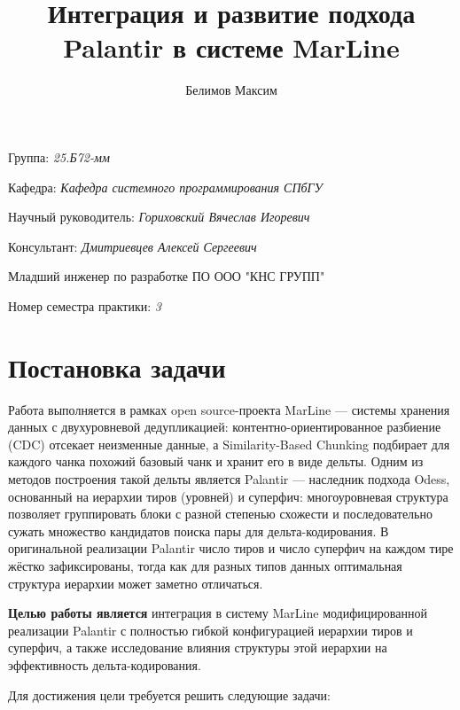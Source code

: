 \documentclass[a4paper]{article}
\title{Интеграция и развитие подхода Palantir в системе MarLine}
\author{Белимов Максим}
\date{}
\begin{document}
\maketitle

\begin{flushright}
    Группа: \emph{25.Б72-мм}

    Кафедра: \emph{Кафедра системного программирования СПбГУ}

    Научный руководитель: \emph{Гориховский Вячеслав Игоревич}

    Консультант: \emph{Дмитриевцев Алексей Сергеевич}

    Младший инженер по разработке ПО ООО "КНС ГРУПП"

    Номер семестра практики: \emph{3}
\end{flushright}

\section{Постановка задачи}

Работа выполняется в рамках open source-проекта MarLine --- системы хранения данных с двухуровневой дедупликацией: контентно-ориентированное разбиение (CDC) отсекает неизменные данные, а Similarity-Based Chunking подбирает для каждого чанка похожий базовый чанк и хранит его в виде дельты. Одним из методов построения такой дельты является Palantir --- наследник подхода Odess, основанный на иерархии тиров (уровней) и суперфич: многоуровневая структура позволяет группировать блоки с разной степенью схожести и последовательно сужать множество кандидатов поиска пары для дельта-кодирования. В оригинальной реализации Palantir число тиров и число суперфич на каждом тире жёстко зафиксированы, тогда как для разных типов данных оптимальная структура иерархии может заметно отличаться.

\textbf{Целью работы является} интеграция в систему MarLine модифицированной реализации Palantir с полностью гибкой конфигурацией иерархии тиров и суперфич, а также исследование влияния структуры этой иерархии на эффективность дельта-кодирования.

Для достижения цели требуется решить следующие задачи:
\end{document}
